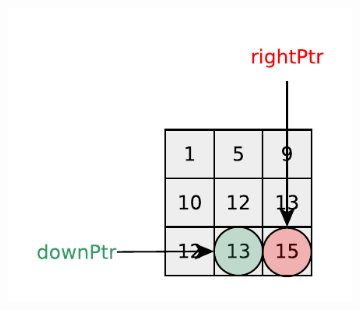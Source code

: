 \begin{figure}
\begin{subfigure}[t]{0.32\textwidth}
        \caption{}
        \label{fig:kth_smallest_in_sorted_matrix:visit6}
    \end{subfigure}
    \hfill
    \begin{subfigure}[t]{0.32\textwidth}
        \includegraphics[width=1\linewidth]{sources/kth_smallest_in_sorted_matrix/images/visit7}
        \caption{}
        \label{fig:kth_smallest_in_sorted_matrix:visit7}
    \end{subfigure}
    
    


\end{figure}
